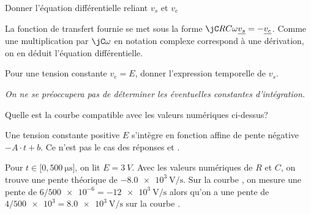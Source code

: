 \bigskip\smallskip




\begin{enonce}
  Donner l’équation différentielle reliant \(v_{s}\) et \(v_{e}\)
\end{enonce}
\begin{corrige}
  La fonction de transfert fournie se met sous la forme \(\jC RC\omega \underline{v_{s}} = -\underline{v_{e}}\). Comme une multiplication par \(\jC \omega\) en notation complexe correspond à une dérivation, on en déduit l’équation différentielle.
\end{corrige}




\begin{enonce}
  Pour une tension constante \(v_{e} = E\), donner l’expression temporelle de \(v_{s}\). \par 
  {\itshape On ne se préoccupera pas de déterminer les éventuelles constantes d’intégration.}\par
\end{enonce}




\begin{enonce}
  Quelle est la courbe compatible avec les valeurs numériques ci-dessus?\par
\end{enonce}
\reponse{\reponseB{}}

\begin{corrige}
  Une tension constante positive \(E\) s’intègre en fonction affine de pente négative \(-A\cdot t+b\). Ce n’est pas le cas des réponses \reponseC{} et \reponseD{}.

  Pour \(t\in \big[0, \SI{500}{\micro\second}\big]\), on lit \(E = \SI{3}{V}\). Avec les valeurs numériques de \(R\) et \(C\), on trouve une pente théorique de \(-\SI{8.0e3}{\volt\per\second}\). Sur la courbe \reponseA{}, on mesure une pente de \(6/\num{500e-6} = -\SI{12e3}{\volt\per\second}\) alors qu’on a une pente de \(4/\num{500e3} = \SI{8.0e3}{\volt\per\second}\) sur la courbe \reponseB{}.
\end{corrige}

